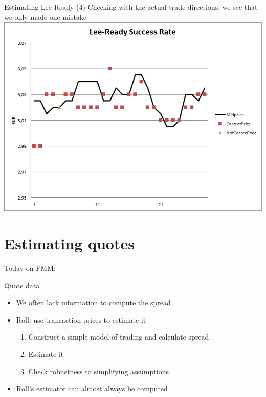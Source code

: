 \documentclass[english,10pt]{beamer}
\begin{document}
\begin{frame}{Estimating Lee-Ready (4)}
	Checking with the actual trade directions, we see that we only made one mistake
	\center
	\includegraphics[scale=0.39]{pics/L2_leereadysuccess}
\end{frame}



\section{Estimating quotes}

\begin{frame}{Today on FMM:}
	\tableofcontents[currentsection]
\end{frame}


\begin{frame}{Quote data}
	\begin{itemize}
		\item We often lack information to compute the spread
		\item Roll: use transaction prices to estimate it
		\begin{enumerate}
			\item Construct a simple model of trading and calculate spread
			\item Estimate it
			\item Check robustness to simplifying assumptions
		\end{enumerate}
		\item Roll's estimator can almost always be computed
	\end{itemize}
\end{frame}
\end{document}
